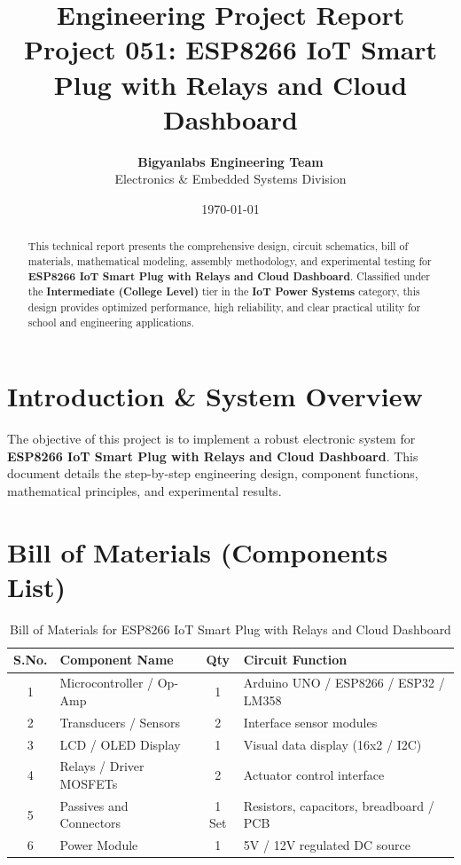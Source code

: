 \documentclass[11pt,a4paper]{article}
\title{\textbf{\Huge Engineering Project Report}\\[0.5em] \Large Project 051: ESP8266 IoT Smart Plug with Relays and Cloud Dashboard}
\author{\textbf{Bigyanlabs Engineering Team}\\ Electronics \& Embedded Systems Division}
\date{\today}
\begin{document}
\maketitle
\thispagestyle{empty}

\begin{abstract}
This technical report presents the comprehensive design, circuit schematics, bill of materials, mathematical modeling, assembly methodology, and experimental testing for \textbf{ESP8266 IoT Smart Plug with Relays and Cloud Dashboard}. Classified under the \textbf{Intermediate (College Level)} tier in the \textbf{IoT Power Systems} category, this design provides optimized performance, high reliability, and clear practical utility for school and engineering applications.
\end{abstract}

\newpage
\tableofcontents
\newpage

\section{Introduction \& System Overview}
The objective of this project is to implement a robust electronic system for \textbf{ESP8266 IoT Smart Plug with Relays and Cloud Dashboard}. This document details the step-by-step engineering design, component functions, mathematical principles, and experimental results.

\section{Bill of Materials (Components List)}
\begin{table}[h!]
\centering
\caption{Bill of Materials for ESP8266 IoT Smart Plug with Relays and Cloud Dashboard}
\vspace{0.5em}
\begin{tabular}{clcp{7cm}}
\toprule
\textbf{S.No.} & \textbf{Component Name} & \textbf{Qty} & \textbf{Circuit Function} \\
\midrule
1 & Microcontroller / Op-Amp & 1 & Arduino UNO / ESP8266 / ESP32 / LM358 \\
2 & Transducers / Sensors & 2 & Interface sensor modules \\
3 & LCD / OLED Display & 1 & Visual data display (16x2 / I2C) \\
4 & Relays / Driver MOSFETs & 2 & Actuator control interface \\
5 & Passives and Connectors & 1 Set & Resistors, capacitors, breadboard / PCB \\
6 & Power Module & 1 & 5V / 12V regulated DC source \\
\bottomrule
\end{tabular}
\end{table}
\end{document}
